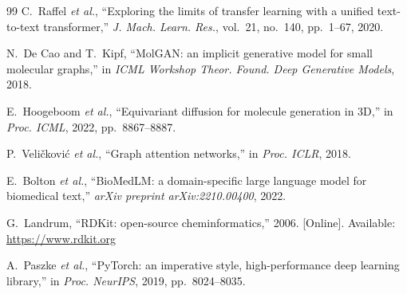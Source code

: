 \documentclass[conference]{IEEEtran}
\begin{document}
\begin{thebibliography}{99}
C.~Raffel \textit{et al.},
``Exploring the limits of transfer learning with a unified text-to-text transformer,''
\textit{J. Mach. Learn. Res.}, vol.~21, no.~140, pp.~1--67, 2020.

N.~De Cao and T.~Kipf,
``MolGAN: an implicit generative model for small molecular graphs,''
in \textit{ICML Workshop Theor. Found. Deep Generative Models}, 2018.

E.~Hoogeboom \textit{et al.},
``Equivariant diffusion for molecule generation in 3D,''
in \textit{Proc. ICML}, 2022, pp.~8867--8887.

P.~Veli\v{c}kovi\'c \textit{et al.},
``Graph attention networks,''
in \textit{Proc. ICLR}, 2018.

E.~Bolton \textit{et al.},
``BioMedLM: a domain-specific large language model for biomedical text,''
\textit{arXiv preprint arXiv:2210.00400}, 2022.

G.~Landrum,
``RDKit: open-source cheminformatics,''
2006. [Online]. Available: \url{https://www.rdkit.org}

A.~Paszke \textit{et al.},
``PyTorch: an imperative style, high-performance deep learning library,''
in \textit{Proc. NeurIPS}, 2019, pp.~8024--8035.

\end{thebibliography}
\end{document}

